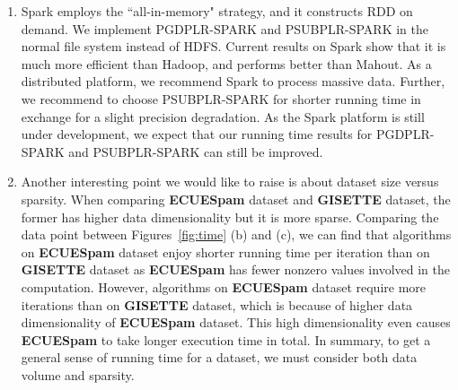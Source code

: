 \documentclass[10pt, conference, compsocconf]{IEEEtran}
\begin{document}
\begin{enumerate}
\item Spark employs the ``all-in-memory" strategy, and it constructs RDD on demand. We implement PGDPLR-SPARK and PSUBPLR-SPARK in the normal file system instead of HDFS.
          Current results on Spark show that it is much more efficient than Hadoop, and performs better than Mahout.
          As a distributed platform, we recommend Spark to process massive data. Further, we recommend to choose PSUBPLR-SPARK for shorter running time in exchange for a slight precision degradation.
          As the Spark platform is still under development, we expect that our running time results for PGDPLR-SPARK and PSUBPLR-SPARK can still be improved.

\item Another interesting point we would like to raise is about dataset size versus sparsity. When comparing \textbf{ECUESpam} dataset and \textbf{GISETTE} dataset, the former has higher data dimensionality but it is more sparse.
          Comparing the data point between Figures~\ref{fig:time} (b) and (c), we can find that algorithms on \textbf{ECUESpam} dataset enjoy shorter running time per iteration than on \textbf{GISETTE} dataset as \textbf{ECUESpam} has fewer nonzero values involved in the computation.
          However, algorithms on \textbf{ECUESpam} dataset require more iterations than on \textbf{GISETTE} dataset, which is because of higher data dimensionality of \textbf{ECUESpam} dataset. This high dimensionality even causes \textbf{ECUESpam} to take longer execution time in total.
          In summary, to get a general sense of running time for a dataset, we must consider both data volume and sparsity.
\end{enumerate}
\end{document}
